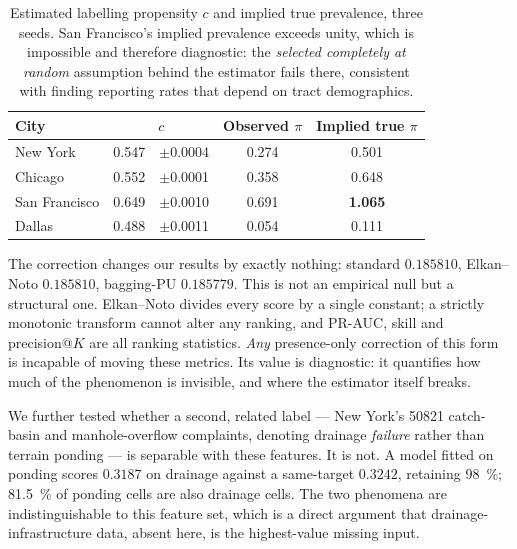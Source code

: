 \documentclass[11pt]{article}
\newcommand{\best}[1]{\textbf{#1}}
\begin{document}
\begin{table}[t]
\centering\small
\caption{Estimated labelling propensity $c$ and implied true prevalence, three
seeds. San Francisco's implied prevalence exceeds unity, which is impossible and
therefore diagnostic: the \emph{selected completely at random} assumption behind
the estimator fails there, consistent with \citet{agostini2024} finding
reporting rates that depend on tract demographics.}
\label{tab:pu}
\begin{tabular}{@{}lS[table-format=1.3]@{\,}lS[table-format=1.3]S[table-format=1.3]@{}}
\toprule
City &  & {Observed $\pi$} & {Implied true $\pi$} \\
\midrule
New York       & 0.547 & {\scriptsize$\pm$0.0004} & 0.274 & 0.501 \\
Chicago        & 0.552 & {\scriptsize$\pm$0.0001} & 0.358 & 0.648 \\
San Francisco  & 0.649 & {\scriptsize$\pm$0.0010} & 0.691 & \best{1.065} \\
Dallas         & 0.488 & {\scriptsize$\pm$0.0011} & 0.054 & 0.111 \\
\bottomrule
\end{tabular}
\end{table}

The correction changes our results by exactly nothing:
standard $0.185810$, Elkan--Noto $0.185810$, bagging-PU $0.185779$. This is not
an empirical null but a structural one. Elkan--Noto divides every score by a
single constant; a strictly monotonic transform cannot alter any ranking, and
PR-AUC, skill and precision@$K$ are all ranking statistics. \emph{Any}
presence-only correction of this form is incapable of moving these metrics.
Its value is diagnostic: it quantifies how much of the phenomenon is invisible,
and where the estimator itself breaks.

We further tested whether a second, related label --- New York's \num{50821}
catch-basin and manhole-overflow complaints, denoting drainage \emph{failure}
rather than terrain ponding --- is separable with these features. It is not. A
model fitted on ponding scores $0.3187$ on drainage against a same-target
$0.3242$, retaining \SI{98}{\percent}; \SI{81.5}{\percent} of ponding cells are
also drainage cells. The two phenomena are indistinguishable to this feature
set, which is a direct argument that drainage-infrastructure data, absent here,
is the highest-value missing input.

\end{document}
